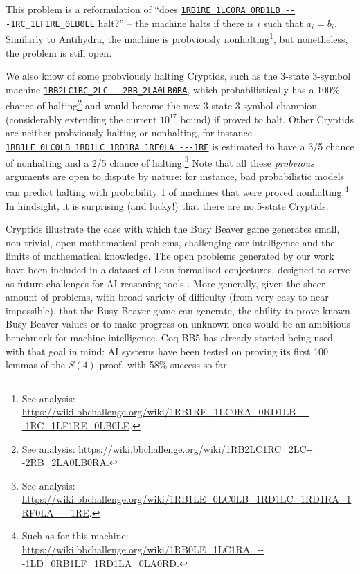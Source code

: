 \documentclass[a4paper,british]{article}
\theoremstyle{definition} %
\numberwithin{equation}{section}
\theoremstyle{definition} %
\newcommand{\tm}[1]{\href{https://bbchallenge.org/#1}{\texttt{\nolinkurl{#1}}}}
\newcommand{\CoqBB}{Coq-BB5\xspace}
\begin{document}
This problem is a reformulation of  ``does \tm{1RB1RE_1LC0RA_0RD1LB_---1RC_1LF1RE_0LB0LE} halt?'' -- the machine halts if there is $i$ such that $a_i = b_i$. Similarly to Antihydra, the machine is probviously nonhalting\footnote{See analysis: {\scriptsize \url{https://wiki.bbchallenge.org/wiki/1RB1RE_1LC0RA_0RD1LB_---1RC_1LF1RE_0LB0LE}}. }, but nonetheless, the problem is still open.

We also know of some probviously halting Cryptids, such as the 3-state 3-symbol machine \tm{1RB2LC1RC_2LC---2RB_2LA0LB0RA}, which probabilistically  has a 100\% chance of halting\footnote{See analysis: {\scriptsize \url{https://wiki.bbchallenge.org/wiki/1RB2LC1RC_2LC---2RB_2LA0LB0RA}}.} and would become the new 3-state 3-symbol champion (considerably extending the current $10^{17}$ bound) if proved to halt. Other Cryptids are neither probviously halting or nonhalting, for instance \tm{1RB1LE_0LC0LB_1RD1LC_1RD1RA_1RF0LA_---1RE} is estimated to have a 3/5 chance of nonhalting and a 2/5 chance of halting.\footnote{See analysis: {\scriptsize \url{https://wiki.bbchallenge.org/wiki/1RB1LE_0LC0LB_1RD1LC_1RD1RA_1RF0LA_---1RE}}.} Note that all these \textit{probvious} arguments are open to dispute by nature: for instance, bad probabilistic models can predict halting with probability 1 of machines that were proved nonhalting.\footnote{Such as for this machine: \url{https://wiki.bbchallenge.org/wiki/1RB0LE_1LC1RA_---1LD_0RB1LF_1RD1LA_0LA0RD}.} In hindsight, it is surprising (and lucky!) that there are no 5-state Cryptids.

Cryptids illustrate the ease with which the Busy Beaver game generates small, non-trivial, open mathematical problems, challenging our intelligence and the limits of mathematical knowledge. The open problems generated by our work have been included in a dataset of Lean-formalised conjectures, designed to serve as future challenges for AI reasoning tools \cite{google-deepmind-formal-conjectures}. More generally, given the sheer amount of problems, with broad variety of difficulty (from very easy to near-impossible), that the Busy Beaver game can generate, the ability to prove known Busy Beaver values or to make progress on unknown ones would be an ambitious benchmark for machine intelligence. \CoqBB has already started being used with that goal in mind: AI systems have been tested on proving its first 100 lemmas of the $S(4)$ proof, with 58\% success so far~\cite{teodorescu2024nlir}.
\end{document}
